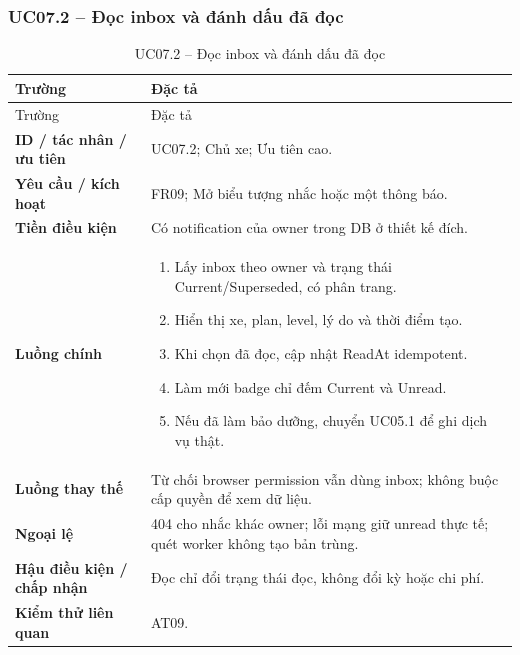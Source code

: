 \subsubsection{UC07.2 -- Đọc inbox và đánh dấu đã đọc}\label{uc:UC07.2}
\begin{smalltable}\begin{longtable}{L{3.2cm}L{11.8cm}}
\caption{UC07.2 -- Đọc inbox và đánh dấu đã đọc}\label{tab:UC07.2}\\
\toprule Trường & Đặc tả\\\midrule\endfirsthead
\toprule Trường & Đặc tả\\\midrule\endhead
\textbf{ID / tác nhân / ưu tiên} & UC07.2; Chủ xe; Ưu tiên cao.\\
\textbf{Yêu cầu / kích hoạt} & FR09; Mở biểu tượng nhắc hoặc một thông báo.\\
\textbf{Tiền điều kiện} & Có notification của owner trong DB ở thiết kế đích.\\
\textbf{Luồng chính} & \begin{enumerate}[leftmargin=*,nosep]
\item Lấy inbox theo owner và trạng thái Current/Superseded, có phân trang.
\item Hiển thị xe, plan, level, lý do và thời điểm tạo.
\item Khi chọn đã đọc, cập nhật ReadAt idempotent.
\item Làm mới badge chỉ đếm Current và Unread.
\item Nếu đã làm bảo dưỡng, chuyển UC05.1 để ghi dịch vụ thật.
\end{enumerate}\\
\textbf{Luồng thay thế} & Từ chối browser permission vẫn dùng inbox; không buộc cấp quyền để xem dữ liệu.\\
\textbf{Ngoại lệ} & 404 cho nhắc khác owner; lỗi mạng giữ unread thực tế; quét worker không tạo bản trùng.\\
\textbf{Hậu điều kiện / chấp nhận} & Đọc chỉ đổi trạng thái đọc, không đổi kỳ hoặc chi phí.\\
\textbf{Kiểm thử liên quan} & AT09.\\
\bottomrule\end{longtable}\end{smalltable}
